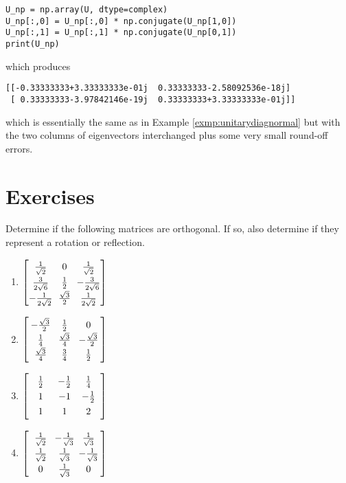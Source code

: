 \begin{lstlisting}
U_np = np.array(U, dtype=complex)
U_np[:,0] = U_np[:,0] * np.conjugate(U_np[1,0])
U_np[:,1] = U_np[:,1] * np.conjugate(U_np[0,1])
print(U_np)    
\end{lstlisting}
which produces
\begin{lstlisting}
[[-0.33333333+3.33333333e-01j  0.33333333-2.58092536e-18j]
 [ 0.33333333-3.97842146e-19j  0.33333333+3.33333333e-01j]]    
\end{lstlisting}
which is essentially the same as in Example \ref{exmp:unitarydiagnormal} but with the two columns of eigenvectors interchanged plus some very small round-off errors.

\section{Exercises}

\begin{Exercise}
Determine if the following matrices are orthogonal. If so, also determine if they represent a rotation or reflection.
\begin{enumerate}[label=(\alph*)]
\item $\renewcommand\arraystretch{1.3}\left[\begin{array}{wc{15pt}wc{15pt}wc{15pt}}
\frac{1}{\sqrt{2}} & 0 & \frac{1}{\sqrt{2}}\\
\frac{3}{2\sqrt{6}} & \frac{1}{2} & -\frac{3}{2\sqrt{6}}\\
-\frac{1}{2\sqrt{2}} & \frac{\sqrt{3}}{2} & \frac{1}{2\sqrt{2}}
\end{array}\right]$
\item $\renewcommand\arraystretch{1.3}\left[\begin{array}{wc{15pt}wc{15pt}wc{15pt}}
-\frac{\sqrt{3}}{2} & \frac{1}{2} & 0\\
\frac{1}{4} & \frac{\sqrt{3}}{4} & -\frac{\sqrt{3}}{2}\\
\frac{\sqrt{3}}{4} & \frac{3}{4} & \frac{1}{2}
\end{array}\right]$
\item $\renewcommand\arraystretch{1.3}\left[\begin{array}{wc{15pt}wc{15pt}wc{15pt}}
\frac{1}{2}&-\frac{1}{2}&\frac{1}{4}\\
1&-1&-\frac{1}{2}\\ 
1&1&2 \end{array}\right]$
\item $\renewcommand\arraystretch{1.3}\left[\begin{array}{wc{15pt}wc{15pt}wc{15pt}}
\frac{1}{\sqrt{2}} & -\frac{1}{\sqrt{3}} & \frac{1}{\sqrt{3}}\\
\frac{1}{\sqrt{2}} & \frac{1}{\sqrt{3}} & -\frac{1}{\sqrt{3}}\\
0 & \frac{1}{\sqrt{3}} & 0
\end{array}\right]$
\end{enumerate}
\end{Exercise}

